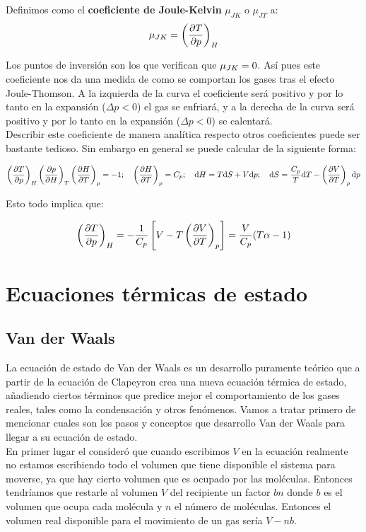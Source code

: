 \documentclass[12pt]{book}
\begin{document}
Definimos como el \textbf{coeficiente de Joule-Kelvin} $\mu_{JK}$ o $\mu_{JT}$ a:
\begin{equation}
\mu_{JK} = \left( \frac{\partial T}{\partial p} \right)_H
\end{equation}


Los puntos de inversión son los que verifican que $\mu_{JK} = 0$. Así pues este coeficiente nos da una medida de como se comportan los gases tras el efecto Joule-Thomson. A la izquierda de la curva el coeficiente será positivo y por lo tanto en la expansión ($\Delta p <0$) el gas se enfriará, y a la derecha de la curva será positivo y por lo tanto en la expansión ($\Delta p < 0$) se calentará. \\

Describir este coeficiente de manera analítica respecto otros coeficientes puede ser bastante tedioso. Sin embargo en general se puede calcular de la siguiente forma:

$$ \left( \frac{\partial T}{\partial p} \right)_H \left( \frac{\partial p}{\partial H} \right)_T \left( \frac{\partial H}{\partial T} \right)_p=-1; \quad \left( \frac{\partial H}{\partial T} \right)_p =C_p; \quad \mathrm{d} H = T \mathrm{d} S + V \mathrm{d} p; \quad \mathrm{d} S = \dfrac{C_p}{T} \mathrm{d} T - \left( \frac{\partial V}{\partial T} \right)_p \mathrm{d} p $$

Esto todo implica que:

\begin{equation}
\left( \frac{\partial T}{\partial p} \right)_H = - \dfrac{1}{C_p}  \left[ V-T\left( \frac{\partial V}{\partial T} \right)_p \right] = \dfrac{V}{C_p} (T \alpha -1)
\end{equation}

\section{Ecuaciones térmicas de estado}

\subsection{Van der Waals}

La ecuación de estado de Van der Waals es un desarrollo puramente teórico que a partir de la ecuación de Clapeyron crea una nueva ecuación térmica de estado, añadiendo ciertos términos que predice mejor el comportamiento de los gases reales, tales como la condensación y otros fenómenos. Vamos a tratar primero de mencionar cuales son los pasos y conceptos que desarrollo Van der Waals para llegar a su ecuación de estado. \\

En primer lugar el consideró que cuando escribimos $V$ en la ecuación realmente no estamos escribiendo todo el volumen que tiene disponible el sistema para moverse, ya que hay cierto volumen que es ocupado por las moléculas. Entonces tendríamos que restarle al volumen $V$ del recipiente un factor $bn$ donde $b$ es el volumen que ocupa cada molécula y $n$ el número de moléculas. Entonces el volumen real disponible para el movimiento de un gas sería $V-nb$. \\
 
\end{document}
